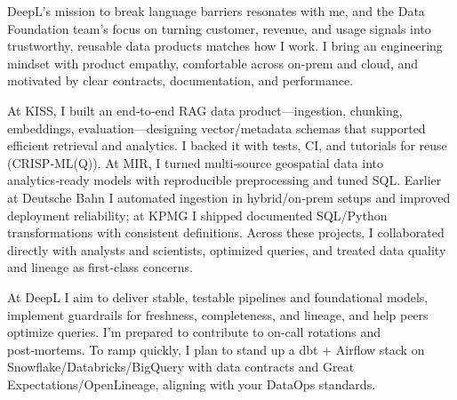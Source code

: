 DeepL’s mission to break language barriers resonates with me, and the Data Foundation team’s focus on turning customer, revenue, and usage signals into trustworthy, reusable data products matches how I work. I bring an engineering mindset with product empathy, comfortable across on‑prem and cloud, and motivated by clear contracts, documentation, and performance.

At KISS, I built an end‑to‑end RAG data product—ingestion, chunking, embeddings, evaluation—designing vector/metadata schemas that supported efficient retrieval and analytics. I backed it with tests, CI, and tutorials for reuse (CRISP‑ML(Q)). At MIR, I turned multi‑source geospatial data into analytics‑ready models with reproducible preprocessing and tuned SQL. Earlier at Deutsche Bahn I automated ingestion in hybrid/on‑prem setups and improved deployment reliability; at KPMG I shipped documented SQL/Python transformations with consistent definitions. Across these projects, I collaborated directly with analysts and scientists, optimized queries, and treated data quality and lineage as first‑class concerns.

At DeepL I aim to deliver stable, testable pipelines and foundational models, implement guardrails for freshness, completeness, and lineage, and help peers optimize queries. I’m prepared to contribute to on‑call rotations and post‑mortems. To ramp quickly, I plan to stand up a dbt + Airflow stack on Snowflake/Databricks/BigQuery with data contracts and Great Expectations/OpenLineage, aligning with your DataOps standards.